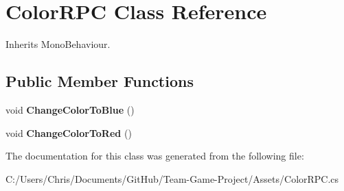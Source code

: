 \hypertarget{class_color_r_p_c}{}\section{Color\+R\+PC Class Reference}
\label{class_color_r_p_c}


Inherits Mono\+Behaviour.

\subsection*{Public Member Functions}
\begin{DoxyCompactItemize}
\item 
void {\bfseries Change\+Color\+To\+Blue} ()\hypertarget{class_color_r_p_c_a70e9b67d9b24202c3ce1cb32f86f53be}{}\label{class_color_r_p_c_a70e9b67d9b24202c3ce1cb32f86f53be}

\item 
void {\bfseries Change\+Color\+To\+Red} ()\hypertarget{class_color_r_p_c_a6d4ecccf04e03bd29e0df5489143c57b}{}\label{class_color_r_p_c_a6d4ecccf04e03bd29e0df5489143c57b}

\end{DoxyCompactItemize}


The documentation for this class was generated from the following file\+:\begin{DoxyCompactItemize}
\item 
C\+:/\+Users/\+Chris/\+Documents/\+Git\+Hub/\+Team-\/\+Game-\/\+Project/\+Assets/Color\+R\+P\+C.\+cs\end{DoxyCompactItemize}
